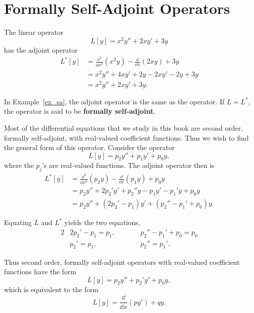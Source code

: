 \section{Formally Self-Adjoint Operators}


\begin{Example}
  \label{ex_sa}
  The linear operator
  \[ L[y] = x^2 y'' + 2 x y' + 3 y \]
  has the adjoint operator
  \begin{align*} 
    L^*[y] &= \frac{\dd^2}{\dd x^2} (x^2 y) - \frac{\dd}{\dd x} (2x y) + 3y \\
    &= x^2 y'' + 4 x y' + 2y - 2 x y' - 2y + 3y \\
    &= x^2 y'' + 2x y' + 3y.
  \end{align*}
\end{Example}



In Example~\ref{ex_sa}, the adjoint operator is the same as the operator. 
If $L = L^*$, the operator is said to be \textbf{formally self-adjoint}.








Most of the differential equations that we study in this book are 
second order, formally self-adjoint, with real-valued coefficient functions.
Thus we wish to find the general form of this operator.
Consider the operator
\[ L[y] = p_2 y'' + p_1 y' + p_0 y,\]
where the $p_j$'s are real-valued functions.
The adjoint operator then is
\begin{align*}
  L^*[y] &= \frac{\dd^2}{\dd x^2} (p_2 y) - \frac{\dd}{\dd x} (p_1 y) + p_0 y \\
  &= p_2 y'' + 2p_2' y' + p_2'' y - p_1 y' - p_1' y + p_0 y \\
  &= p_2 y'' + (2p_2' - p_1) y' + (p_2'' - p_1' + p_0) y.
\end{align*}

Equating $L$ and $L^*$ yields the two equations,
\begin{alignat*}{2}
  &2p_2' - p_1 = p_1, &\qquad &p_2'' - p_1' + p_0 = p_0 \\
  &p_2' = p_1, &\qquad &p_2'' = p_1'.
\end{alignat*}

Thus second order, formally self-adjoint operators with real-valued coefficient
functions have the form
\[ L[y] = p_2 y'' + p_2' y' + p_0 y,\]
which is equivalent to the form
\[ L[y] = \frac{\dd}{\dd x} (p y') + q y.\]


